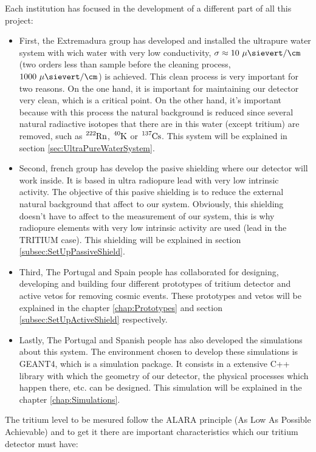 Each institution has focused in the development of a different part of all this project:
\begin{itemize}
\item{} First, the Extremadura group has developed and installed the ultrapure water system with wich water with very low conductivity, $\sigma \approx 10~\mu\sievert/\cm$ (two orders less than sample before the cleaning process, $1000~\mu\sievert/\cm$) is achieved. This clean process is very important for two reasons. On the one hand, it is important for maintaining our detector very clean, which is a critical point. On the other hand, it's important because with this process the natural background is reduced since several natural radiactive isotopes that there are in this water (except tritium) are removed, such as $\ce{^{222}Rn}$, $\ce{^{40}K}$ or $\ce{^{137}Cs}$. This system will be explained in section \ref{sec:UltraPureWaterSystem}.

\item{} Second, french group has develop the pasive shielding where our detector will work inside. It is based in ultra radiopure lead with very low intrinsic activity. The objective of this pasive shielding is to reduce the external natural background that affect to our system. Obviously, this shielding doesn't have to affect to the measurement of our system, this is why radiopure elements with very low intrinsic activity are used (lead in the TRITIUM case). This shielding will be explained in section \ref{subsec:SetUpPassiveShield}.

\item{} Third, The Portugal and Spain people has collaborated for designing, developing and building four different prototypes of tritium detector and active vetos for removing cosmic events. These prototypes and vetos will be explained in the chapter \ref{chap:Prototypes} and section \ref{subsec:SetUpActiveShield} respectively.

\item{} Lastly, The Portugal and Spanish people has also developed the simulations about this system. The environment chosen to develop these simulations is GEANT4, which is a simulation package. It consists in a extensive C++ library with which the geometry of our detector, the physical processes which happen there, etc. can be designed. This simulation will be explained in the chapter \ref{chap:Simulations}.

\end{itemize}

The tritium level to be mesured follow the ALARA principle (As Low As Possible Achievable) and to get it there are important characteristics which our tritium detector must have:

